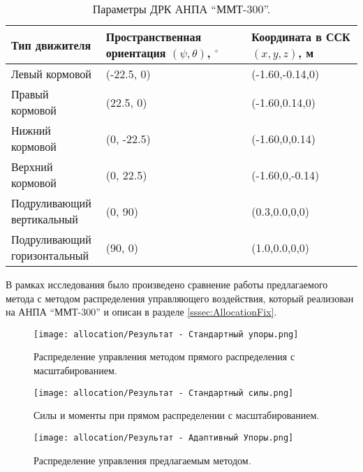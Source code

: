 \begin{table}
    \caption{Параметры ДРК АНПА ``ММТ-300''.}
    \label{tab:mmt300_propulsion}
    \centering
    \begin{tabular}{lll}
        \toprule
        Тип движителя & \makecell[l]{Пространственная ориентация \\ $(\psi, \theta)$, $^{\circ}$} & \makecell[l]{Координата в ССК \\ 
        $(x,y,z)$, м} \\
        \midrule
        Левый   кормовой & (-22.5, 0) & (-1.60,-0.14,0) \\
        Правый  кормовой & (22.5, 0)  & (-1.60,0.14,0) \\
        Нижний  кормовой & (0, -22.5) & (-1.60,0,0.14) \\
        Верхний кормовой & (0, 22.5)  & (-1.60,0,-0.14) \\
        \makecell[l]{Подруливающий \\ вертикальный}   & (0, 90) & (0.3,0.0,0,0) \\
        \makecell[l]{Подруливающий \\ горизонтальный} & (90, 0) & (1.0,0.0,0,0) \\
        \bottomrule
    \end{tabular}
\end{table}

В рамках исследования было произведено сравнение работы предлагаемого метода с методом распределения управляющего воздействия, который реализован на АНПА ``ММТ-300'' и описан в разделе \ref{sssec:AllocationFix}.

\begin{figure}[ht]
    \centering
    \texttt{[image: allocation/Результат - Стандартный упоры.png]}
    \caption{Распределение управления методом прямого распределения с масштабированием.}
    \label{fig:mmt-300-allocation-fix-thrust}
\end{figure}

\begin{figure}[ht]
    \centering
    \texttt{[image: allocation/Результат - Стандартный силы.png]}
    \caption{Силы и моменты при прямом распределении с масштабированием.}
    \label{fig:mmt-300-allocation-fix-force}
\end{figure}

\begin{figure}[ht]
    \centering
    \texttt{[image: allocation/Результат - Адаптивный Упоры.png]}
    \caption{Распределение управления предлагаемым методом.}
    \label{fig:mmt-300-allocation-optimal-thrust}
\end{figure}

